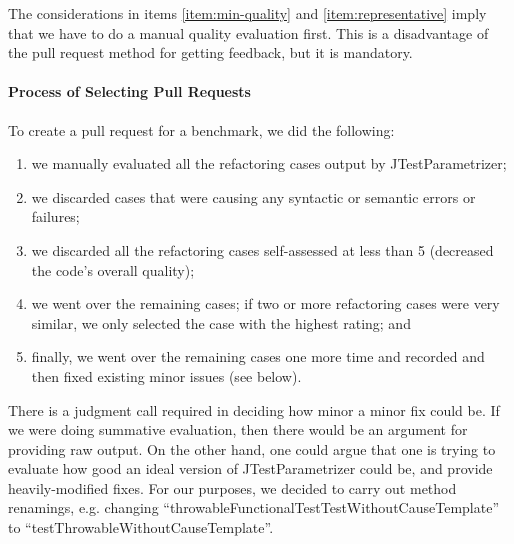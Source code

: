 The considerations in items \ref{item:min-quality} and \ref{item:representative} imply that we have to do a manual quality evaluation first. This is a disadvantage of the pull request method for getting feedback, but it is mandatory.


\paragraph{Process of Selecting Pull Requests} \label{section:selection-process}

To create a pull request for a benchmark, we did the following:

 \begin{enumerate}

  \item \label{item:selecting-pr-step-one} we manually evaluated all the refactoring cases output by JTestParametrizer;

  \item \label{item:selecting-pr-step-two} we discarded cases that were causing any syntactic or semantic errors or failures;

  \item \label{item:selecting-pr-step-three} we discarded all the refactoring cases self-assessed at less than 5 (decreased the code's overall quality);
  
  \item \label{item:selecting-representative} we went over the remaining cases; if two or more refactoring cases were very similar, we only selected the case with the highest rating; and
  
  \item \label{item:minor-changes} finally, we went over the remaining cases one more time and recorded and then fixed existing minor issues (see below). 
\end{enumerate}

There is a judgment call required in deciding how minor a minor fix could be. If we were doing summative evaluation, then there would be an argument for providing raw output. On the other hand, one could argue that one is trying to evaluate how good an ideal version of JTestParametrizer could be, and provide heavily-modified fixes. For our purposes, we decided to carry out method renamings, e.g. changing ``throwableFunctionalTestTestWithoutCauseTemplate'' to ``testThrowableWithoutCauseTemplate''.



